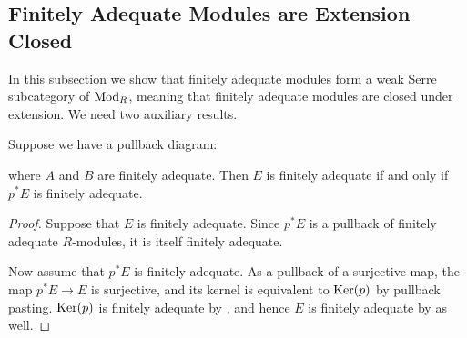 %
%

\subsection{Finitely Adequate Modules are Extension Closed}
\label{ss:finad-extension-closed}

In this subsection we show that finitely adequate modules form a weak
Serre subcategory of $\textup{Mod}_{R}$, meaning that finitely adequate
modules are closed under extension. We need two auxiliary results.

\begin{lemma}\label{lem:fin-adeq-ext-pb-red}
Suppose we have a pullback diagram:
  \begin{center}
  \end{center}
  where $A$ and $B$ are finitely adequate. Then $E$ is finitely adequate if and only if $p^*E$ is finitely adequate.
\end{lemma}

\begin{proof}
  Suppose that $E$ is finitely adequate.
  Since $p^*E$ is a pullback of finitely adequate $R$-modules, it is itself finitely adequate.

  Now assume that $p^*E$ is finitely adequate.
  As a pullback of a surjective map, the map $p^*E\to E$ is surjective, and its kernel is equivalent to $\operatorname{Ker}(p)$ by pullback pasting.
  $\operatorname{Ker}(p)$ is finitely adequate by , and hence $E$ is finitely adequate by  as well.
\end{proof}

